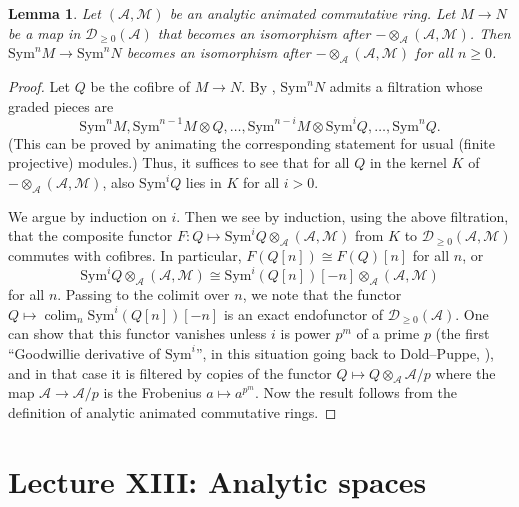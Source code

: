 \documentclass[11pt]{amsbook}
\DeclareMathOperator{\colim}{colim}
\numberwithin{equation}{section}
\numberwithin{theorem}{section}
\newtheorem{lemma}[theorem]{Lemma}
\theoremstyle{definition}
\begin{document}
\begin{lemma} Let $(\mathcal A,\mathcal M)$ be an analytic animated commutative ring. Let $M\to N$ be a map in $\mathcal D_{\geq 0}(\mathcal A)$ that becomes an isomorphism after $-\otimes_{\mathcal A} (\mathcal A,\mathcal M)$. Then $\mathrm{Sym}^n M\to \mathrm{Sym}^n N$ becomes an isomorphism after $-\otimes_{\mathcal A} (\mathcal A,\mathcal M)$ for all $n\geq 0$.
\end{lemma}

\begin{proof} Let $Q$ be the cofibre of $M\to N$. By \cite[Construction 25.2.5.4]{LurieSAG}, $\mathrm{Sym}^n N$ admits a filtration whose graded pieces are
\[
\mathrm{Sym}^n M,\mathrm{Sym}^{n-1} M\otimes Q,\ldots,\mathrm{Sym}^{n-i} M\otimes \mathrm{Sym}^i Q,\ldots,\mathrm{Sym}^n Q.
\]
(This can be proved by animating the corresponding statement for usual (finite projective) modules.) Thus, it suffices to see that for all $Q$ in the kernel $K$ of $-\otimes_{\mathcal A} (\mathcal A,\mathcal M)$, also $\mathrm{Sym}^i Q$ lies in $K$ for all $i>0$.

We argue by induction on $i$. Then we see by induction, using the above filtration, that the composite functor $F: Q\mapsto \mathrm{Sym}^i Q\otimes_{\mathcal A} (\mathcal A,\mathcal M)$ from $K$ to $\mathcal D_{\geq 0}(\mathcal A,\mathcal M)$ commutes with cofibres. In particular, $F(Q[n])\cong F(Q)[n]$ for all $n$, or
\[
\mathrm{Sym}^i Q\otimes_{\mathcal A} (\mathcal A,\mathcal M)\cong \mathrm{Sym}^i(Q[n])[-n]\otimes_{\mathcal A} (\mathcal A,\mathcal M)
\]
for all $n$. Passing to the colimit over $n$, we note that the functor $Q\mapsto \colim_n \mathrm{Sym}^i(Q[n])[-n]$ is an exact endofunctor of $\mathcal D_{\geq 0}(\mathcal A)$. One can show that this functor vanishes unless $i$ is power $p^m$ of a prime $p$ (the first ``Goodwillie derivative of $\mathrm{Sym}^i$'', in this situation going back to Dold--Puppe, \cite{DoldPuppe}), and in that case it is filtered by copies of the functor $Q\mapsto Q\otimes_{\mathcal A} \mathcal A/p$ where the map $\mathcal A\to \mathcal A/p$ is the Frobenius $a\mapsto a^{p^m}$. Now the result follows from the definition of analytic animated commutative rings.
\end{proof}

\newpage

\section{Lecture XIII: Analytic spaces}
\end{document}
